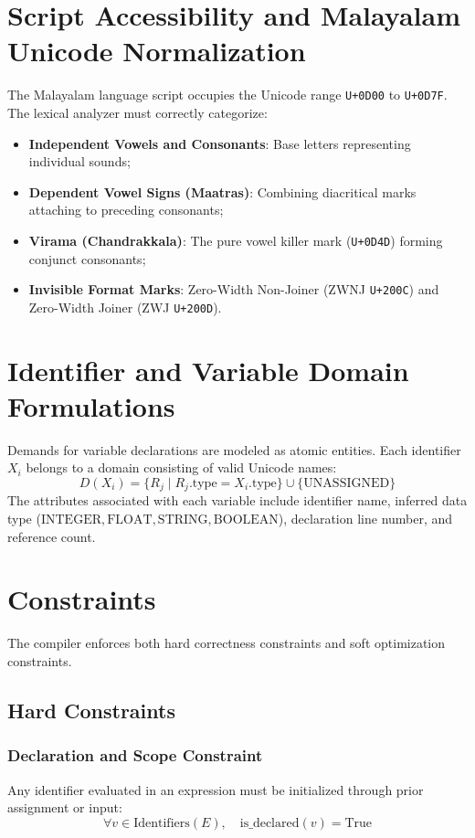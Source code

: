 \documentclass[12pt,a4paper]{report}
\begin{document}
\section{Script Accessibility and Malayalam Unicode Normalization}
The Malayalam language script occupies the Unicode range \texttt{U+0D00} to \texttt{U+0D7F}. The lexical analyzer must correctly categorize:
\begin{itemize}
    \item \textbf{Independent Vowels and Consonants}: Base letters representing individual sounds;
    \item \textbf{Dependent Vowel Signs (Maatras)}: Combining diacritical marks attaching to preceding consonants;
    \item \textbf{Virama (Chandrakkala)}: The pure vowel killer mark (\texttt{U+0D4D}) forming conjunct consonants;
    \item \textbf{Invisible Format Marks}: Zero-Width Non-Joiner (ZWNJ \texttt{U+200C}) and Zero-Width Joiner (ZWJ \texttt{U+200D}).
\end{itemize}

\section{Identifier and Variable Domain Formulations}
Demands for variable declarations are modeled as atomic entities. Each identifier $X_i$ belongs to a domain consisting of valid Unicode names:
\begin{equation}
    D(X_i) = \{ R_j \mid R_j.\text{type} = X_i.\text{type} \} \cup \{ \text{UNASSIGNED} \}
\end{equation}
The attributes associated with each variable include identifier name, inferred data type ($\text{INTEGER}, \text{FLOAT}, \text{STRING}, \text{BOOLEAN}$), declaration line number, and reference count.

\section{Constraints}
The compiler enforces both hard correctness constraints and soft optimization constraints.

\subsection{Hard Constraints}

\subsubsection{Declaration and Scope Constraint}
Any identifier evaluated in an expression must be initialized through prior assignment or input:
\begin{equation}
    \forall v \in \text{Identifiers}(E), \quad \text{is\_declared}(v) = \text{True}
\end{equation}
\end{document}
